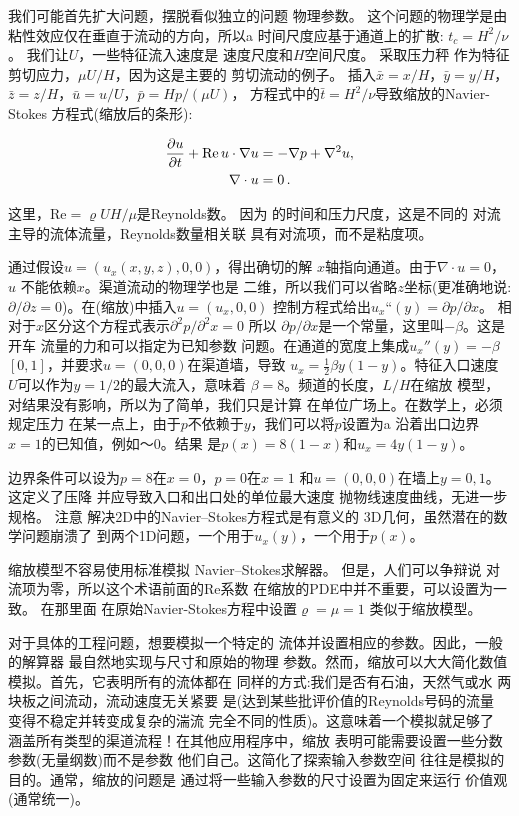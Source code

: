
我们可能首先扩大问题，摆脱看似独立的问题
物理参数。 这个问题的物理学是由
粘性效应仅在垂直于流动的方向，所以a
时间尺度应基于通道上的扩散: $t_c =
H^2/\nu$。 我们让$U$，一些特征流入速度是
速度尺度和$H$空间尺度。 采取压力秤
作为特征剪切应力，$\mu U/H$，因为这是主要的
剪切流动的例子。 插入$\bar x = x/H$，$\bar y = y/H$，
$\bar z = z/H$，$\bar u = u/U$，$\bar p = Hp/(\mu U)$，
方程式中的$\bar t = H^2/\nu$导致缩放的Navier-Stokes
方程式(缩放后的条形):


\begin{align*}
\frac{\partial u}{\partial t} + \mathrm{Re}\, u\cdot\nabla u
&= -\nabla p + \nabla^2 u,\\
\nabla\cdot u &= 0\tp
\end{align*}

这里，$\mathrm{Re} = \varrho UH/\mu$是Reynolds数。 因为
的时间和压力尺度，这是不同的
对流主导的流体流量，Reynolds数量相关联
具有对流项，而不是粘度项。

通过假设$u=(u_x(x,y,z),0,0)$，得出确切的解
$x$轴指向通道。由于$\nabla\cdot u=0$，$u$
不能依赖$x$。渠道流动的物理学也是
二维，所以我们可以省略$z$坐标(更准确地说:
$\partial/\partial z=0$)。在(缩放)中插入$u=(u_x,0,0)$
控制方程式给出$u_x“(y) = \partial p/\partial x$。
相对于$x$区分这个方程式表示$\partial^2
p/\partial^2 x =0$ 所以 $\partial
p/\partial x$是一个常量，这里叫$-\beta$。这是开车
流量的力和可以指定为已知参数
问题。在通道的宽度上集成$u_x''(y)=-\beta$
$[0,1]$，并要求$u=(0, 0, 0)$在渠道墙，导致
$u_x=\frac{1}{2}\beta y(1-y)$。特征入口速度
$U$可以作为$y=1/2$的最大流入，意味着
$\beta = 8$。频道的长度，$L/H$在缩放
模型，对结果没有影响，所以为了简单，我们只是计算
在单位广场上。在数学上，必须规定压力
在某一点上，由于$p$不依赖于$y$，我们可以将$p$设置为a
沿着出口边界$x=1$的已知值，例如〜0。结果
是$p(x)=8(1-x)$和$u_x=4y(1-y)$。

边界条件可以设为$p=8$在$x=0$，$p=0$在$x=1$
和$u=(0, 0, 0)$在墙上$y=0,1$。 这定义了压降
并应导致入口和出口处的单位最大速度
抛物线速度曲线，无进一步规格。 注意
解决2D中的Navier--Stokes方程式是有意义的
3D几何，虽然潜在的数学问题崩溃了
到两个1D问题，一个用于$u_x(y)$，一个用于$p(x)$。

缩放模型不容易使用标准模拟
Navier--Stokes求解器。 但是，人们可以争辩说
对流项为零，所以这个术语前面的Re系数
在缩放的PDE中并不重要，可以设置为一致。 在那里面
在原始Navier-Stokes方程中设置$\varrho = \mu = 1$
类似于缩放模型。

对于具体的工程问题，想要模拟一个特定的
流体并设置相应的参数。因此，一般的解算器
最自然地实现与尺寸和原始的物理
参数。然而，缩放可以大大简化数值
模拟。首先，它表明所有的流体都在
同样的方式:我们是否有石油，天然气或水
两块板之间流动，流动速度无关紧要
是(达到某些批评价值的Reynolds号码的流量
变得不稳定并转变成复杂的湍流
完全不同的性质)。这意味着一个模拟就足够了
涵盖所有类型的渠道流程！在其他应用程序中，缩放
表明可能需要设置一些分数
参数(无量纲数)而不是参数
他们自己。这简化了探索输入参数空间
往往是模拟的目的。通常，缩放的问题是
通过将一些输入参数的尺寸设置为固定来运行
价值观(通常统一)。
